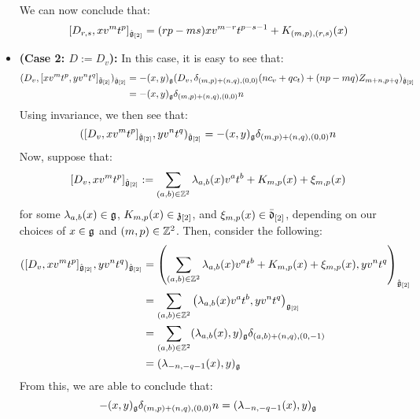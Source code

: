 \begin{remark}
\begin{itemize}
                    We can now conclude that:
                        $$[D_{r, s}, x v^m t^p]_{\hat{\mathfrak{g}}_{[2]}} = ( rp - ms ) x v^{m - r} t^{p - s - 1} + K_{(m, p), (r, s)}(x)$$
                    \item \textbf{(Case 2: $D := D_v$):} In this case, it is easy to see that:
                        $$
                            \begin{aligned}
                                ( D_v, [x v^m t^p, y v^n t^q]_{\tilde{\mathfrak{g}}_{[2]}} )_{\hat{\mathfrak{g}}_{[2]}} & = -(x, y)_{\mathfrak{g}} ( D_v, \delta_{(m, p) + (n, q), (0, 0)} ( n c_v + q c_t ) + (np - mq) Z_{m + n, p + q} )_{\hat{\mathfrak{g}}_{[2]}}
                                \\
                                & = -(x, y)_{\mathfrak{g}} \delta_{(m, p) + (n, q), (0, 0)} n
                            \end{aligned}
                        $$
                    Using invariance, we then see that:
                        $$( [D_v, x v^m t^p]_{\hat{\mathfrak{g}}_{[2]}}, y v^n t^q )_{\hat{\mathfrak{g}}_{[2]}} = -(x, y)_{\mathfrak{g}} \delta_{(m, p) + (n, q), (0, 0)} n$$
                    Now, suppose that:
                        $$[D_v, x v^m t^p]_{\hat{\mathfrak{g}}_{[2]}} := \sum_{(a, b) \in \mathbb{Z}^2} \lambda_{a, b}(x) v^a t^b + K_{m, p}(x) + \xi_{m, p}(x)$$
                    for some $\lambda_{a, b}(x) \in \mathfrak{g}$, $K_{m, p}(x) \in \mathfrak{z}_{[2]}$, and $\xi_{m, p}(x) \in \bar{\mathfrak{d}}_{[2]}$, depending on our choices of $x \in \mathfrak{g}$ and $(m, p) \in \mathbb{Z}^2$. Then, consider the following:
                        $$
                            \begin{aligned}
                                ( [D_v, x v^m t^p]_{\hat{\mathfrak{g}}_{[2]}}, y v^n t^q )_{\hat{\mathfrak{g}}_{[2]}} & = \left( \sum_{(a, b) \in \mathbb{Z}^2} \lambda_{a, b}(x) v^a t^b + K_{m, p}(x) + \xi_{m, p}(x), y v^n t^q \right)_{\hat{\mathfrak{g}}_{[2]}}
                                \\
                                & = \sum_{(a, b) \in \mathbb{Z}^2} \left( \lambda_{a, b}(x) v^a t^b, y v^n t^q \right)_{\mathfrak{g}_{[2]}}
                                \\
                                & = \sum_{(a, b) \in \mathbb{Z}^2} (\lambda_{a, b}(x), y)_{\mathfrak{g}} \delta_{ (a, b) + (n, q), (0, -1) }
                                \\
                                & = (\lambda_{-n, -q - 1}(x), y)_{\mathfrak{g}}
                            \end{aligned}
                        $$
                    From this, we are able to conclude that:
                        $$-(x, y)_{\mathfrak{g}} \delta_{(m, p) + (n, q), (0, 0)} n = (\lambda_{-n, -q - 1}(x), y)_{\mathfrak{g}}$$

\end{itemize}
\end{remark}
